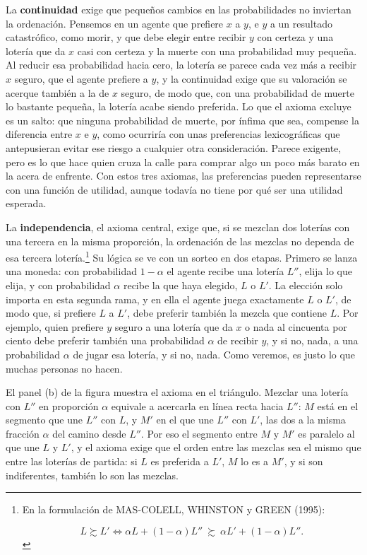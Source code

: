 \documentclass[10pt,a4paper]{article}
\begin{document}
La \textbf{continuidad} exige que pequeños cambios en las probabilidades no inviertan la ordenación. Pensemos en un agente que prefiere $x$ a $y$, e $y$ a un resultado catastrófico, como morir, y que debe elegir entre recibir $y$ con certeza y una lotería que da $x$ casi con certeza y la muerte con una probabilidad muy pequeña. Al reducir esa probabilidad hacia cero, la lotería se parece cada vez más a recibir $x$ seguro, que el agente prefiere a $y$, y la continuidad exige que su valoración se acerque también a la de $x$ seguro, de modo que, con una probabilidad de muerte lo bastante pequeña, la lotería acabe siendo preferida. Lo que el axioma excluye es un salto: que ninguna probabilidad de muerte, por ínfima que sea, compense la diferencia entre $x$ e $y$, como ocurriría con unas preferencias lexicográficas que antepusieran evitar ese riesgo a cualquier otra consideración. Parece exigente, pero es lo que hace quien cruza la calle para comprar algo un poco más barato en la acera de enfrente. Con estos tres axiomas, las preferencias pueden representarse con una función de utilidad, aunque todavía no tiene por qué ser una utilidad esperada.

La \textbf{independencia}, el axioma central, exige que, si se mezclan dos loterías con una tercera en la misma proporción, la ordenación de las mezclas no dependa de esa tercera lotería.\footnote{%
  En la formulación de MAS-COLELL, WHINSTON y GREEN (1995):

  $$L\succsim L'\iff\alpha L+(1-\alpha)L''\ \succsim\ \alpha L'+(1-\alpha)L''.$$

} Su lógica se ve con un sorteo en dos etapas. Primero se lanza una moneda: con probabilidad $1-\alpha$ el agente recibe una lotería $L''$, elija lo que elija, y con probabilidad $\alpha$ recibe la que haya elegido, $L$ o $L'$. La elección solo importa en esta segunda rama, y en ella el agente juega exactamente $L$ o $L'$, de modo que, si prefiere $L$ a $L'$, debe preferir también la mezcla que contiene $L$. Por ejemplo, quien prefiere $y$ seguro a una lotería que da $x$ o nada al cincuenta por ciento debe preferir también una probabilidad $\alpha$ de recibir $y$, y si no, nada, a una probabilidad $\alpha$ de jugar esa lotería, y si no, nada. Como veremos, es justo lo que muchas personas no hacen.

El panel (b) de la figura muestra el axioma en el triángulo. Mezclar una lotería con $L''$ en proporción $\alpha$ equivale a acercarla en línea recta hacia $L''$: $M$ está en el segmento que une $L''$ con $L$, y $M'$ en el que une $L''$ con $L'$, las dos a la misma fracción $\alpha$ del camino desde $L''$. Por eso el segmento entre $M$ y $M'$ es paralelo al que une $L$ y $L'$, y el axioma exige que el orden entre las mezclas sea el mismo que entre las loterías de partida: si $L$ es preferida a $L'$, $M$ lo es a $M'$, y si son indiferentes, también lo son las mezclas.
\end{document}
